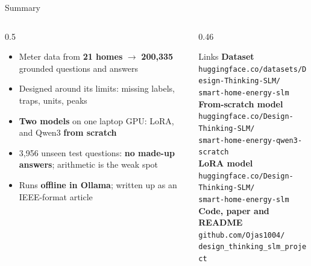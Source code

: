 \documentclass[aspectratio=169,11pt]{beamer}
\newcommand{\speaker}[1]{\gdef\thespeaker{#1}}\gdef\thespeaker{}
\begin{document}
\speaker{Speaker B}
\begin{frame}{Summary}
  \begin{columns}[T]
    \begin{column}{0.5\textwidth}
      \small
      \begin{itemize}\setlength{\itemsep}{0.3em}
        \item Meter data from \textbf{21 homes} $\rightarrow$ \textbf{200,335} grounded questions and answers
        \item Designed around its limits: missing labels, traps, units, peaks
        \item \textbf{Two models} on one laptop GPU: LoRA, and Qwen3 \textbf{from scratch}
        \item 3,956 unseen test questions: \textbf{no made-up answers}; arithmetic is the weak spot
        \item Runs \textbf{offline in Ollama}; written up as an IEEE-format article
      \end{itemize}
    \end{column}
    \begin{column}{0.46\textwidth}
      \begin{block}{Links}
        \scriptsize
        \textbf{Dataset}\\ \texttt{huggingface.co/datasets/Design-Thinking-SLM/}\\\texttt{smart-home-energy-slm}\\[0.3em]
        \textbf{From-scratch model}\\ \texttt{huggingface.co/Design-Thinking-SLM/}\\\texttt{smart-home-energy-qwen3-scratch}\\[0.3em]
        \textbf{LoRA model}\\ \texttt{huggingface.co/Design-Thinking-SLM/}\\\texttt{smart-home-energy-slm}\\[0.3em]
        \textbf{Code, paper and README}\\ \texttt{github.com/Ojas1004/}\\\texttt{design\_thinking\_slm\_project}
      \end{block}
    \end{column}
  \end{columns}
  \vspace{0.1em}
\end{frame}
\end{document}
